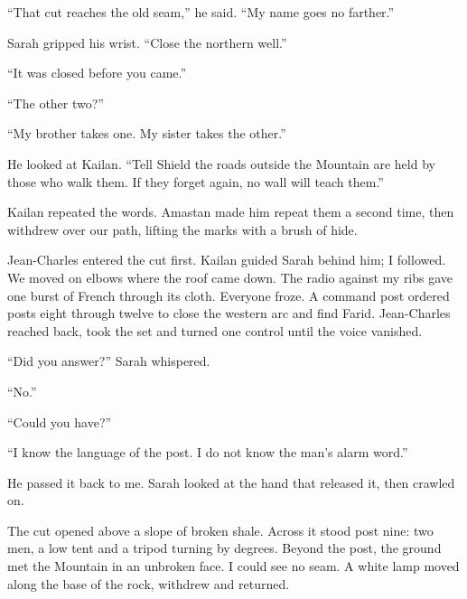 ``That cut reaches the old seam,'' he said. ``My name goes no farther.''\par

Sarah gripped his wrist. ``Close the northern well.''\par

``It was closed before you came.''\par

``The other two?''\par

``My brother takes one. My sister takes the other.''\par

He looked at Kailan. ``Tell Shield the roads outside the Mountain are held by those who walk them. If they forget again, no wall will teach them.''\par

Kailan repeated the words. Amastan made him repeat them a second time, then withdrew over our path, lifting the marks with a brush of hide.\par

Jean-Charles entered the cut first. Kailan guided Sarah behind him; I followed. We moved on elbows where the roof came down. The radio against my ribs gave one burst of French through its cloth. Everyone froze. A command post ordered posts eight through twelve to close the western arc and find Farid. Jean-Charles reached back, took the set and turned one control until the voice vanished.\par

``Did you answer?'' Sarah whispered.\par

``No.''\par

``Could you have?''\par

``I know the language of the post. I do not know the man's alarm word.''\par

He passed it back to me. Sarah looked at the hand that released it, then crawled on.\par

The cut opened above a slope of broken shale. Across it stood post nine: two men, a low tent and a tripod turning by degrees. Beyond the post, the ground met the Mountain in an unbroken face. I could see no seam. A white lamp moved along the base of the rock, withdrew and returned.\par


